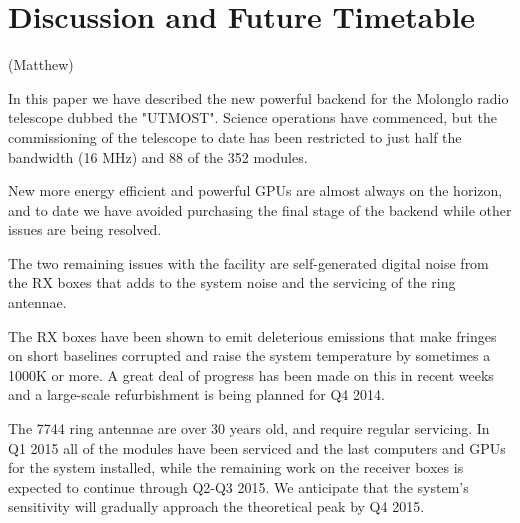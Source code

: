 \section{Discussion and Future Timetable}(Matthew)

In this paper we have described the new powerful backend for the Molonglo radio telescope dubbed the "UTMOST". Science operations have commenced, but the commissioning of the telescope to date has been restricted to just half the bandwidth (16 MHz) and 88 of the 352 modules. 

New more energy efficient and powerful GPUs are almost always on the horizon, and to date we have avoided purchasing the final stage of the backend while other issues are being resolved.

The two remaining issues with the facility are self-generated digital noise from the RX boxes that adds to the system noise and the servicing of the ring antennae. 

The RX boxes have been shown to emit deleterious emissions that make fringes on short baselines corrupted and raise the system temperature by sometimes a 1000K or more. A great deal of progress has been made on this in recent weeks and a large-scale refurbishment is being planned for Q4 2014.

The 7744 ring antennae are over 30 years old, and require regular servicing. In Q1 2015 all of the modules have been serviced and the last computers and GPUs for the system installed, while the remaining work on the receiver boxes is expected to continue through Q2-Q3 2015. We anticipate that the system's sensitivity will gradually approach the theoretical peak by Q4 2015.